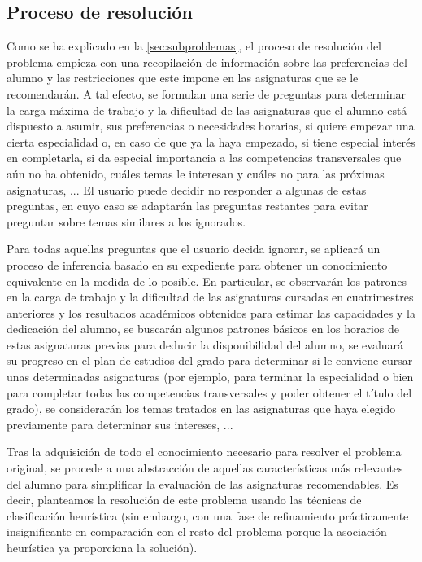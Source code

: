 
\subsection{Proceso de resolución} \label{sec:desc-resolucion}

Como se ha explicado en la \autoref{sec:subproblemas}, el proceso de 
resolución del problema empieza con una recopilación de información sobre las 
preferencias del alumno y las restricciones que este impone en las asignaturas 
que se le recomendarán. A tal efecto, se formulan una serie de preguntas para 
determinar la carga máxima de trabajo y la dificultad de las asignaturas que 
el alumno está dispuesto a asumir, sus preferencias o necesidades horarias, 
si quiere empezar una cierta especialidad o, en caso de que ya la haya 
empezado, si tiene especial interés en completarla, si da especial importancia 
a las competencias transversales que aún no ha obtenido, cuáles temas le 
interesan y cuáles no para las próximas asignaturas, ... El usuario puede 
decidir no responder a algunas de estas preguntas, en cuyo caso se adaptarán 
las preguntas restantes para evitar preguntar sobre temas similares a los 
ignorados.

Para todas aquellas preguntas que el usuario decida ignorar, se aplicará un 
proceso de inferencia basado en su expediente para obtener un conocimiento 
equivalente en la medida de lo posible. En particular, se observarán los 
patrones en la carga de trabajo y la dificultad de las asignaturas cursadas 
en cuatrimestres anteriores y los resultados académicos obtenidos para estimar 
las capacidades y la dedicación del alumno, se buscarán algunos patrones 
básicos en los horarios de estas asignaturas previas para deducir la 
disponibilidad del alumno, se evaluará su progreso en el plan de estudios del 
grado para determinar si le conviene cursar unas determinadas asignaturas 
(por ejemplo, para terminar la especialidad o bien para completar todas las 
competencias transversales y poder obtener el título del grado), se 
considerarán los temas tratados en las asignaturas que haya elegido 
previamente para determinar sus intereses, ...

Tras la adquisición de todo el conocimiento necesario para resolver el 
problema original, se procede a una abstracción de aquellas características 
más relevantes del alumno para simplificar la evaluación de las asignaturas 
recomendables. Es decir, planteamos la resolución de este problema usando las 
técnicas de clasificación heurística (sin embargo, con una fase de 
refinamiento prácticamente insignificante en comparación con el resto del 
problema porque la asociación heurística ya proporciona la solución).

